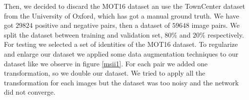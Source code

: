 \documentclass[12pt, a4paper, titlepage,twoside,openright]{article}
\begin{document}
Then, we decided to discard the MOT16 dataset an use the TownCenter dataset \cite{townCenter} from the University of Oxford, which has got a manual ground truth. We have got $29824$ positive and negative pairs, then a dataset of $59648$ image pairs. We split the dataset between training and validation set, $80 \%$ and $20 \%$ respectively. For testing we selected a set of identities of the MOT16 dataset. To regularize and enlarge our dataset we applied some data augmentation techniques to our dataset like we observe in figure \ref{msii1}. For each pair we added one transformation, so we double our dataset. We tried to apply all the transformation for each images but the dataset was too noisy and the network did not converge.






\begin{figure}[H]
		
\centering


\end{figure}
\end{document}
